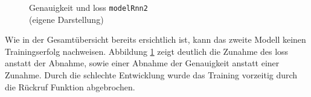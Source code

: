 \documentclass[
    12pt, %
    DIV10,
    ngerman, %
    a4paper, %
    oneside, %
    titlepage, %
    parskip=half, %
    headings=normal, %
    listof=totoc, %
    bibliography=totoc, %
    index=totoc, %
    captions=tableheading, %
    final %
]{scrreprt}
\begin{document}
\begin{figure}[H]
\caption{Genauigkeit und loss \texttt{modelRnn2}\\(eigene Darstellung)}\label{fig:rnn2}
\end{figure}
Wie in der Gesamtübersicht bereits ersichtlich ist, kann das zweite Modell keinen Trainingserfolg nachweisen. 
Abbildung \ref{fig:rnn2} zeigt deutlich die Zunahme des loss anstatt der Abnahme, sowie einer Abnahme der Genauigkeit anstatt einer Zunahme. Durch die schlechte Entwicklung wurde das Training vorzeitig durch die Rückruf Funktion abgebrochen.
\end{document}
